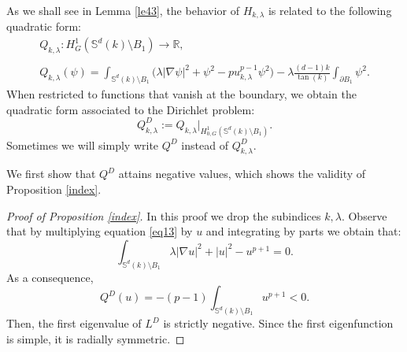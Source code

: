 \documentclass[reqno]{amsart}
\def\R{\mathbb R}
\def\Sk{\mathbb{S}^{d}(k)}
\numberwithin{equation}{section}
\newenvironment{key words}{\textbf{Keywords}\mbox{  }}{ }
\begin{document}
As we shall see in Lemma \ref{le43}, the behavior of $H_{k, \lambda}$ is related to the following quadratic form:
\begin{equation} \label{Q}
\begin{array}{c} Q_{k,\lambda}: H^1_{G}(\Sk \setminus B_1) \to \R, \\ \\ 	Q_{k,\lambda}(\psi)= \displaystyle \int_{\mathbb{S}^{d}(k)\setminus B_{1}}\big(\lambda |\nabla \psi|^2 +\psi^2-p u_{k, \lambda}^{p-1}\psi^2 \big) -\lambda\frac{(d-1)k}{\tan(k)}\int_{\partial B_{1}} \psi^2. \end{array}
\end{equation}
When restricted to functions that vanish at the boundary, we obtain the quadratic form associated to the Dirichlet problem:
\begin{equation} \label{QD}
\displaystyle	Q^D_{k,\lambda} := Q_{k,\lambda}|_{ H^1_{0,G}(\Sk \setminus B_1) }.
\end{equation}
Sometimes we will simply write $Q^D$ instead of $Q^D_{k,\lambda}$.

\medskip

We first show that $Q^D$ attains negative values, which shows the validity of Proposition \ref{index}.

\begin{proof}[Proof of Proposition \ref{index}]
 In this proof we drop the subindices $k, \lambda$. Observe that by multiplying equation \eqref{eq13} by $u$ and integrating by parts we obtain that:
$$ \int_{\mathbb{S}^{d}(k)\setminus B_{1}} \lambda |\nabla u|^{2}+ |u|^{2}-u^{p+1}=0.$$
As a consequence,
$$ Q^{D}(u) = -(p-1) \int_{\mathbb{S}^{d}(k)\setminus B_{1}} u^{p+1}<0.$$
Then, the first eigenvalue of $L^D$ is strictly  negative. Since the first eigenfunction is simple, it is radially symmetric.
\end{proof}
\end{document}
